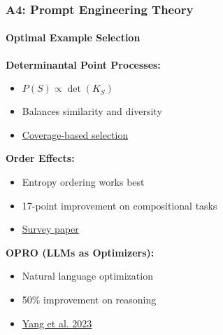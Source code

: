 \documentclass[10pt,aspectratio=169]{beamer}
\begin{document}
\begin{frame}
\frametitle{A4: Prompt Engineering Theory}
\framesubtitle{Optimal Example Selection}

\textbf{Determinantal Point Processes:}
\begin{itemize}
    \item $P(S) \propto \det(K_S)$
    \item Balances similarity and diversity
    \item \href{run:./papers/acl_coverage_based_selection.md}{\color{blue}Coverage-based selection}
\end{itemize}

\vspace{0.5cm}
\textbf{Order Effects:}
\begin{itemize}
    \item Entropy ordering works best
    \item 17-point improvement on compositional tasks
    \item \href{run:./papers/2402.07927_prompt_engineering_survey.pdf}{\color{blue}Survey paper}
\end{itemize}

\vspace{0.5cm}
\textbf{OPRO (LLMs as Optimizers):}
\begin{itemize}
    \item Natural language optimization
    \item 50\% improvement on reasoning
    \item \href{run:./papers/2309.03409_llms_as_optimizers.pdf}{\color{blue}Yang et al. 2023}
\end{itemize}
\end{frame}
\end{document}
